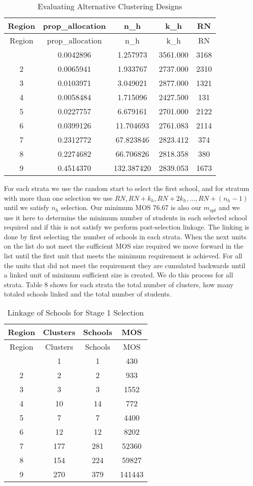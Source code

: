 \documentclass[
  12pt]{article}
\begin{document}
\begin{longtable}[]{@{}ccccc@{}}
\caption{Evaluating Alternative Clustering Designs}\tabularnewline
\toprule\noalign{}
Region & prop\_allocation & n\_h & k\_h & RN \\
\midrule\noalign{}
\endfirsthead
\toprule\noalign{}
Region & prop\_allocation & n\_h & k\_h & RN \\
\midrule\noalign{}
\endhead
\bottomrule\noalign{}
\endlastfoot
1 & 0.0042896 & 1.257973 & 3561.000 & 3168 \\
2 & 0.0065941 & 1.933767 & 2737.000 & 2310 \\
3 & 0.0103971 & 3.049021 & 2877.000 & 1321 \\
4 & 0.0058484 & 1.715096 & 2427.500 & 131 \\
5 & 0.0227757 & 6.679161 & 2701.000 & 2122 \\
6 & 0.0399126 & 11.704693 & 2761.083 & 2114 \\
7 & 0.2312772 & 67.823846 & 2823.412 & 374 \\
8 & 0.2274682 & 66.706826 & 2818.358 & 380 \\
9 & 0.4514370 & 132.387420 & 2839.053 & 1673 \\
\end{longtable}

For each strata we use the random start to select the first school, and
for stratum with more than one selection we use
\(RN, RN+k_h, RN+2k_h,...,RN +(n_h-1)\) until we satisfy \(n_h\)
selection. Our minimum MOS 76.67 is also our \(m_{opt}\) and we use it
here to determine the minimum number of students in each selected school
required and if this is not satisfy we perform post-selection linkage.
The linking is done by first selecting the number of schools in each
strata. When the next units on the list do not meet the sufficient MOS
size required we move forward in the list until the first unit that
meets the minimum requirement is achieved. For all the units that did
not meet the requirement they are cumulated backwards until a linked
unit of minimum sufficient size is created. We do this process for all
strata. Table 8 shows for each strata the total number of clusters, how
many totaled schools linked and the total number of students.

\begin{longtable}[]{@{}cccc@{}}
\caption{Linkage of Schools for Stage 1 Selection}\tabularnewline
\toprule\noalign{}
Region & Clusters & Schools & MOS \\
\midrule\noalign{}
\endfirsthead
\toprule\noalign{}
Region & Clusters & Schools & MOS \\
\midrule\noalign{}
\endhead
\bottomrule\noalign{}
\endlastfoot
1 & 1 & 1 & 430 \\
2 & 2 & 2 & 933 \\
3 & 3 & 3 & 1552 \\
4 & 10 & 14 & 772 \\
5 & 7 & 7 & 4400 \\
6 & 12 & 12 & 8202 \\
7 & 177 & 281 & 52360 \\
8 & 154 & 224 & 59827 \\
9 & 270 & 379 & 141443 \\
\end{longtable}
\end{document}
